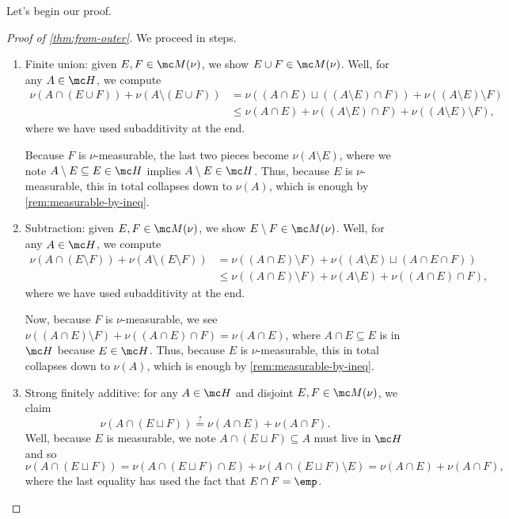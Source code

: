 \documentclass[../notes.tex]{subfiles}
\begin{document}
Let's begin our proof.
\begin{proof}[Proof of \autoref{thm:from-outer}]
	We proceed in steps.
	\begin{enumerate}
		\item Finite union: given $E,F\in\mc M(\nu)$, we show $E\cup F\in\mc M(\nu)$. Well, for any $A\in\mc H$, we compute
		\begin{align*}
			\nu(A\cap(E\cup F))+\nu(A\setminus(E\cup F)) &= \nu((A\cap E)\sqcup((A\setminus E)\cap F))+\nu((A\setminus E)\setminus F) \\
			&\le \nu(A\cap E)+\nu((A\setminus E)\cap F)+\nu((A\setminus E)\setminus F),
		\end{align*}
		where we have used subadditivity at the end.

		Because $F$ is $\nu$-measurable, the last two pieces become $\nu(A\setminus E)$, where we note $A\setminus E\subseteq E\in\mc H$ implies $A\setminus E\in\mc H$. Thus, because $E$ is $\nu$-measurable, this in total collapses down to $\nu(A)$, which is enough by \autoref{rem:measurable-by-ineq}.

		\item Subtraction: given $E,F\in\mc M(\nu)$, we show $E\setminus F\in\mc M(\nu)$. Well, for any $A\in\mc H$, we compute
		\begin{align*}
			\nu(A\cap(E\setminus F))+\nu(A\setminus(E\setminus F)) &= \nu((A\cap E)\setminus F)+\nu((A\setminus E)\sqcup(A\cap E\cap F)) \\
			&\le \nu((A\cap E)\setminus F)+\nu(A\setminus E)+\nu((A\cap E)\cap F),
		\end{align*}
		where we have used subadditivity at the end.
		
		Now, because $F$ is $\nu$-measurable, we see $\nu((A\cap E)\setminus F)+\nu((A\cap E)\cap F)=\nu(A\cap E)$, where $A\cap E\subseteq E$ is in $\mc H$ because $E\in\mc H$. Thus, because $E$ is $\nu$-measurable, this in total collapses down to $\nu(A)$, which is enough by \autoref{rem:measurable-by-ineq}.

		\item Strong finitely additive: for any $A\in\mc H$ and disjoint $E,F\in\mc M(\nu)$, we claim
		\[\nu(A\cap(E\sqcup F))\stackrel?=\nu(A\cap E)+\nu(A\cap F).\]
		Well, because $E$ is measurable, we note $A\cap(E\sqcup F)\subseteq A$ must live in $\mc H$ and so
		\[\nu(A\cap(E\sqcup F))=\nu(A\cap(E\sqcup F)\cap E)+\nu(A\cap(E\sqcup F)\setminus E)=\nu(A\cap E)+\nu(A\cap F),\]
		where the last equality has used the fact that $E\cap F=\emp$.


\end{enumerate}
\end{proof}
\end{document}
